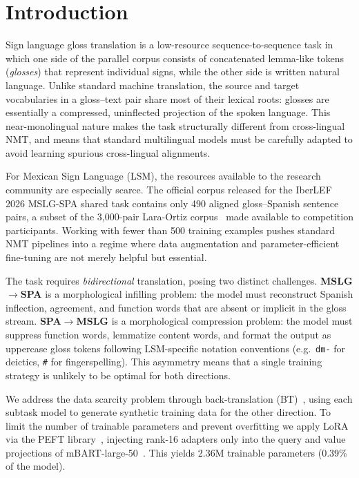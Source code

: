 \documentclass[sigconf,screen]{ceurart}
\begin{document}
\section{Introduction}
\label{sec:intro}

Sign language gloss translation is a low-resource sequence-to-sequence
task in which one side of the parallel corpus consists of concatenated
lemma-like tokens (\emph{glosses}) that represent individual signs,
while the other side is written natural language.
Unlike standard machine translation, the source and target vocabularies
in a gloss--text pair share most of their lexical roots: glosses are
essentially a compressed, uninflected projection of the spoken language.
This near-monolingual nature makes the task structurally different
from cross-lingual NMT, and means that standard multilingual models must
be carefully adapted to avoid learning spurious cross-lingual
alignments.

For Mexican Sign Language (LSM), the resources available to the research
community are especially scarce.
The official corpus released for the IberLEF 2026 MSLG-SPA shared task
contains only 490 aligned gloss--Spanish sentence pairs, a subset of the
3,000-pair Lara-Ortiz corpus~\cite{rodriguez2026overview} made available to
competition participants.
Working with fewer than 500 training examples pushes standard NMT
pipelines into a regime where data augmentation and parameter-efficient
fine-tuning are not merely helpful but essential.

The task requires \emph{bidirectional} translation, posing two distinct
challenges.
\textbf{MSLG$\!\to\!$SPA} is a morphological infilling problem: the
model must reconstruct Spanish inflection, agreement, and function words
that are absent or implicit in the gloss stream.
\textbf{SPA$\!\to\!$MSLG} is a morphological compression problem: the
model must suppress function words, lemmatize content words, and format
the output as uppercase gloss tokens following LSM-specific notation
conventions (e.g.\ \texttt{dm-} for deictics, \texttt{\#} for
fingerspelling).
This asymmetry means that a single training strategy is unlikely to be
optimal for both directions.

We address the data scarcity problem through back-translation
(BT)~\cite{sennrich2016bt}, using each subtask model to generate
synthetic training data for the other direction.
To limit the number of trainable parameters and prevent overfitting we
apply LoRA~\cite{hu2022lora} via the PEFT
library~\cite{mangrulkar2022peft}, injecting rank-16 adapters only
into the query and value projections of mBART-large-50~\cite{tang2020mbart50}.
This yields 2.36M trainable parameters (0.39\% of the model).
\end{document}
